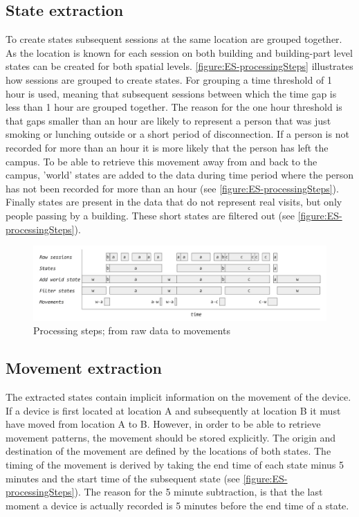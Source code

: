 \subsection{State extraction}\label{ES-stateExtraction}
To create states subsequent sessions at the same location are grouped together. As the location is known for each session on both building and building-part level states can be created for both spatial levels. \autoref{figure:ES-processingSteps} illustrates how sessions are grouped to create states. For grouping a time threshold of 1 hour is used, meaning that subsequent sessions between which the time gap is less than 1 hour are grouped together. The reason for the one hour threshold is that gaps smaller than an hour are likely to represent a person that was just smoking or lunching outside or a short period of disconnection. If a person is not recorded for more than an hour it is more likely that the person has left the campus. To be able to retrieve this movement away from and back to the campus, 'world' states are added to the data during time period where the person has not been recorded for more than an hour (see \autoref{figure:ES-processingSteps}). Finally states are present in the data that do not represent real visits, but only people passing by a building. These short states are filtered out (see \autoref{figure:ES-processingSteps}). 

\begin{figure}[H]
\centering
\includegraphics[scale=0.15]{ES-processingSteps}
\captionsetup{justification=centering}
\caption{Processing steps; from raw data to movements}
\label{figure:ES-processingSteps}
\end{figure}

\subsection{Movement extraction}\label{ES-movementExtraction}
The extracted states contain implicit information on the movement of the device. If a device is first located at location A and subsequently at location B it must have moved from location A to B. However, in order to be able to retrieve movement patterns, the movement should be stored explicitly. The origin and destination of the movement are defined by the locations of both states. The timing of the movement is derived by taking the end time of each state minus 5 minutes and the start time of the subsequent state (see \autoref{figure:ES-processingSteps}). The reason for the 5 minute subtraction, is that the last moment a device is actually recorded is 5 minutes before the end time of a state.  

